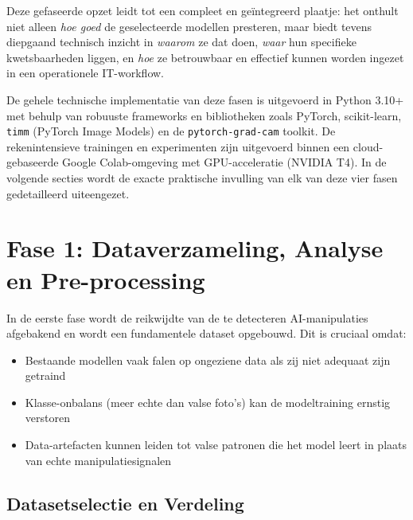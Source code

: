 Deze gefaseerde opzet leidt tot een compleet en geïntegreerd plaatje: het onthult niet alleen \textit{hoe goed} de geselecteerde modellen presteren, maar biedt tevens diepgaand technisch inzicht in \textit{waarom} ze dat doen, \textit{waar} hun specifieke kwetsbaarheden liggen, en \textit{hoe} ze betrouwbaar en effectief kunnen worden ingezet in een operationele IT-workflow.

De gehele technische implementatie van deze fasen is uitgevoerd in Python 3.10+ met behulp van robuuste frameworks en bibliotheken zoals PyTorch, scikit-learn, \texttt{timm} (PyTorch Image Models) en de \texttt{pytorch-grad-cam} toolkit. De rekenintensieve trainingen en experimenten zijn uitgevoerd binnen een cloud-gebaseerde Google Colab-omgeving met GPU-acceleratie (NVIDIA T4). In de volgende secties wordt de exacte praktische invulling van elk van deze vier fasen gedetailleerd uiteengezet.


\section{Fase 1: Dataverzameling, Analyse en Pre-processing}
\label{sec:fase1}

In de eerste fase wordt de reikwijdte van de te detecteren AI-manipulaties afgebakend en wordt een fundamentele dataset opgebouwd. Dit is cruciaal omdat:
\begin{itemize}
    \item Bestaande modellen vaak falen op ongeziene data als zij niet adequaat zijn getraind
    \item Klasse-onbalans (meer echte dan valse foto's) kan de modeltraining ernstig verstoren
    \item Data-artefacten kunnen leiden tot valse patronen die het model leert in plaats van echte manipulatiesignalen
\end{itemize}

\subsection{Datasetselectie en Verdeling}

